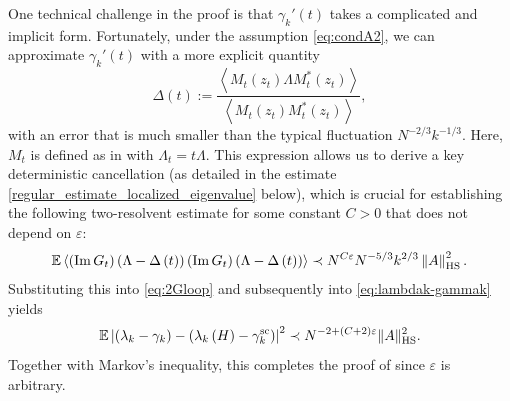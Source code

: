 \documentclass[10pt,reqno]{amsart}
\numberwithin{equation}{section}
\numberwithin{figure}{section}
\theoremstyle{plain} %
\theoremstyle{definition} %
\renewcommand{\txt}[1]{\text{\rm{#1}}}
\newcommand{\E}{\mathbb{E}}
\newcommand{\ii}{\mathrm{i}}
\newcommand{\p}[1]{({#1})}
\newcommand{\pa}[1]{\left({#1}\right)}
\newcommand{\absa}[1]{\left\lvert #1 \right\rvert}
\newcommand{\norma}[1]{\left\lVert #1 \right\rVert}
\newcommand{\avga}[1]{\left\langle #1 \right\rangle}
\DeclareMathOperator{\im}{\mathrm{Im}}
\newcommand{\e}{{\varepsilon}}
\newcommand{\HS}{\txt{HS}}
\numberwithin{equation}{section}
\begin{document}
One technical challenge in the proof is that  $\gamma_k'\pa{t}$ takes a complicated and implicit form. Fortunately, under the assumption \eqref{eq:condA2}, we can approximate $\gamma_k'\pa{t}$ with a more explicit quantity
\begin{equation*}
\Delta\pa{t}:=\frac{\avga{M_t\p{z_t}\Lambda M_t^*\p{z_t}}}{\avga{M_t\p{z_t}M_t^*\p{z_t}}},
\end{equation*}
with an error that is much smaller than the typical fluctuation $N^{-2/3}k^{-1/3}$. Here, $M_t$ is defined as in   with $\Lambda_t=t\Lambda$. This expression allows us to derive a key deterministic cancellation (as detailed in the estimate \eqref{regular_estimate_localized_eigenvalue} below), which is crucial for establishing the following two-resolvent estimate for some constant $C>0$ that does not depend on $\e$:
\begin{equation}\label{eq:2-resolven1}
        \E\avga{\pa{\im G_t}\pa{\Lambda-\Delta\pa{t}}\pa{\im G_t}\pa{\Lambda-\Delta\pa{t}}}\prec N^{C\varepsilon}N^{-5/3}k^{2/3}\norma{A}_{\HS}^2.
\end{equation}
Substituting this into \eqref{eq:2Gloop} and subsequently into \eqref{eq:lambdak-gammak} yields  
$$\E\absa{\pa{\lambda_k-\gamma_k}-\pa{\lambda_k\pa{H}-\gamma_k^\txt{sc}}}^2\prec N^{-2+(C+2)\e}\|A\|_{\HS}^2.$$
Together with Markov's inequality, this completes the proof of  since $\e$ is arbitrary. 


\end{document}

